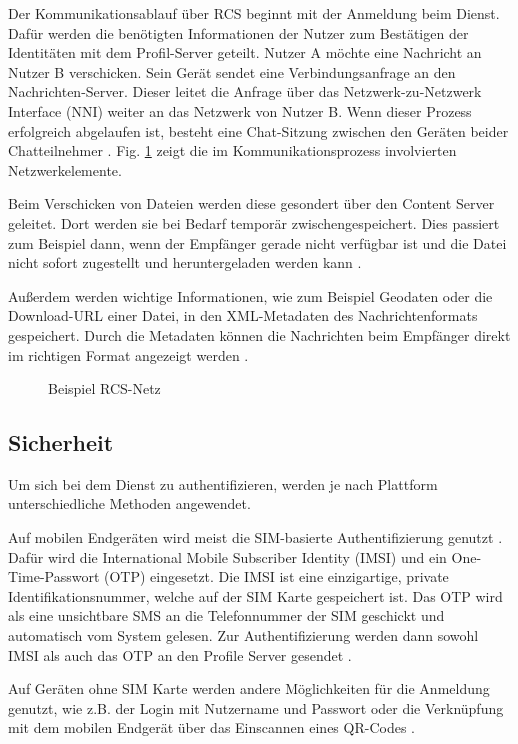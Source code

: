 \documentclass[conference]{IEEEtran}
\begin{document}
Der Kommunikationsablauf über RCS beginnt mit der Anmeldung beim Dienst.
Dafür werden die benötigten Informationen der Nutzer zum Bestätigen der Identitäten mit dem Profil-Server geteilt.
Nutzer A möchte eine Nachricht an Nutzer B verschicken.
Sein Gerät sendet eine Verbindungsanfrage an den Nachrichten-Server.
Dieser leitet die Anfrage über das Netzwerk-zu-Netzwerk Interface (NNI) weiter an das Netzwerk von Nutzer B.
Wenn dieser Prozess erfolgreich abgelaufen ist, besteht eine Chat-Sitzung zwischen den Geräten beider Chatteilnehmer \cite{5gmsg}.
Fig. \ref{rcsnetz} zeigt die im Kommunikationsprozess involvierten Netzwerkelemente.

Beim Verschicken von Dateien werden diese gesondert über den Content Server geleitet.
Dort werden sie bei Bedarf temporär zwischengespeichert.
Dies passiert zum Beispiel dann, wenn der Empfänger gerade nicht verfügbar ist und die Datei nicht sofort zugestellt und heruntergeladen werden kann \cite{5gmsg}.

Außerdem werden wichtige Informationen, wie zum Beispiel Geodaten oder die Download-URL einer Datei, in den XML-Metadaten des Nachrichtenformats gespeichert.
Durch die Metadaten können die Nachrichten beim Empfänger direkt im richtigen Format angezeigt werden \cite{uncoversec}.

\begin{figure}
    \centerline{}
    \caption{Beispiel RCS-Netz \cite{5gmsg}}
    \label{rcsnetz}
\end{figure}

\subsection{Sicherheit}

Um sich bei dem Dienst zu authentifizieren, werden je nach Plattform unterschiedliche Methoden angewendet.

Auf mobilen Endgeräten wird meist die SIM-basierte Authentifizierung genutzt \cite{uniprof}.
Dafür wird die International Mobile Subscriber Identity (IMSI) und ein One-Time-Passwort (OTP) eingesetzt.
Die IMSI ist eine einzigartige, private Identifikationsnummer, welche auf der SIM Karte gespeichert ist.
Das OTP wird als eine unsichtbare SMS an die Telefonnummer der SIM geschickt und automatisch vom System gelesen.
Zur Authentifizierung werden dann sowohl IMSI als auch das OTP an den Profile Server gesendet \cite{5gmsg}.

Auf Geräten ohne SIM Karte werden andere Möglichkeiten für die Anmeldung genutzt, wie z.B. der Login mit Nutzername und Passwort oder die Verknüpfung mit dem mobilen Endgerät über das Einscannen eines QR-Codes \cite{uniprof}.
\end{document}

